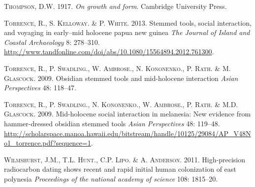\documentclass[]{article}
\begin{document}
\textsc{Thompson}, D.W. 1917. \emph{On growth and form}. Cambridge
University Press.

\textsc{Torrence}, R., S. \textsc{Kelloway}. \& P. \textsc{White}. 2013.
Stemmed tools, social interaction, and voyaging in early--mid holocene
papua new guinea \emph{The Journal of Island and Coastal Archaeology} 8:
278--310.
\url{http://www.tandfonline.com/doi/abs/10.1080/15564894.2012.761300}.

\textsc{Torrence}, R., P. \textsc{Swadling}., W. \textsc{Ambrose}., N.
\textsc{Kononenko}., P. \textsc{Rath}. \& M. \textsc{Glascock}. 2009.
Obsidian stemmed tools and mid-holocene interaction \emph{Asian
Perspectives} 48: 118--47.

\textsc{Torrence}, R., P. \textsc{Swadling}., N. \textsc{Kononenko}., W.
\textsc{Ambrose}., P. \textsc{Rath}. \& M.D. \textsc{Glascock}. 2009.
Mid-holocene social interaction in melanesia: New evidence from
hammer-dressed obsidian stemmed tools \emph{Asian Perspectives} 48:
119--48.
\url{http://scholarspace.manoa.hawaii.edu/bitstream/handle/10125/29084/AP_V48No1_torrence.pdf?sequence=1}.

\textsc{Wilmshurst}, J.M., T.L. \textsc{Hunt}., C.P. \textsc{Lipo}. \&
A. \textsc{Anderson}. 2011. High-precision radiocarbon dating shows
recent and rapid initial human colonization of east polynesia
\emph{Proceedings of the national academy of science} 108: 1815--20.
\end{document}
